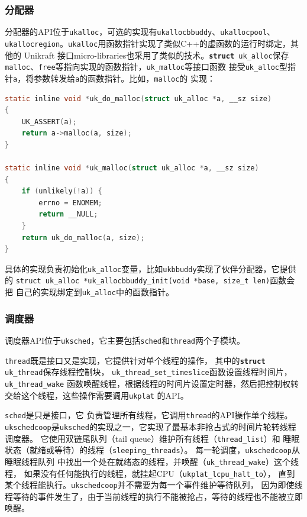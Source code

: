 \documentclass{../runikraft-report}
\begin{document}
\subsubsection{分配器}
分配器的API位于\texttt{ukalloc}，可选的实现有\texttt{ukallocbbuddy}、\texttt{ukallocpool}、
\texttt{ukallocregion}。\texttt{ukalloc}用函数指针实现了类似C++的虚函数的运行时绑定，其他的
Unikraft 接口micro-libraries也采用了类似的技术。\texttt{\textbf{struct} uk\_alloc}保存
\texttt{malloc}、\texttt{free}等指向实现的函数指针，\texttt{uk\_malloc}等接口函数
接受\texttt{uk\_alloc}型指针\texttt{a}，将参数转发给\texttt{a}的函数指针。比如，\texttt{malloc}的
实现：
\begin{lstlisting}[language=C]
static inline void *uk_do_malloc(struct uk_alloc *a, __sz size)
{
	UK_ASSERT(a);
	return a->malloc(a, size);
}

static inline void *uk_malloc(struct uk_alloc *a, __sz size)
{
	if (unlikely(!a)) {
		errno = ENOMEM;
		return __NULL;
	}
	return uk_do_malloc(a, size);
}
\end{lstlisting}

具体的实现负责初始化\texttt{uk\_alloc}变量，比如\texttt{ukbbuddy}实现了伙伴分配器，它提供的
\texttt{struct uk\_alloc *uk\_allocbbuddy\_init(void *base, size\_t len)}函数会把
自己的实现绑定到\texttt{uk\_alloc}中的函数指针。

\subsubsection{调度器}
调度器API位于\texttt{uksched}，它主要包括\texttt{sched}和\texttt{thread}两个子模块。

\texttt{thread}既是接口又是实现，它提供针对单个线程的操作，
其中的\texttt{\textbf{struct} uk\_thread}保存线程控制块，
\texttt{uk\_thread\_set\_timeslice}函数设置线程时间片，\texttt{uk\_thread\_wake}
函数唤醒线程，根据线程的时间片设置定时器，然后把控制权转交给这个线程，这些操作需要调用\texttt{ukplat}
的API。

\texttt{sched}是只是接口，它
负责管理所有线程，它调用\texttt{thread}的API操作单个线程。
\texttt{ukschedcoop}是\texttt{uksched}的实现之一，它实现了最基本非抢占式的时间片轮转线程调度器。
它使用双链尾队列（tail queue）维护所有线程（\texttt{thread\_list}）和
睡眠状态（就绪或等待）的线程（\texttt{sleeping\_threads}）。
每一轮调度，\texttt{ukschedcoop}从睡眠线程队列
中找出一个处在就绪态的线程，并唤醒（\texttt{uk\_thread\_wake}）这个线程，
如果没有任何能执行的线程，就挂起CPU（\texttt{ukplat\_lcpu\_halt\_to}），
直到某个线程能执行。\texttt{ukschedcoop}并不需要为每一个事件维护等待队列，
因为即使线程等待的事件发生了，由于当前线程的执行不能被抢占，等待的线程也不能被立即唤醒。
\end{document}
